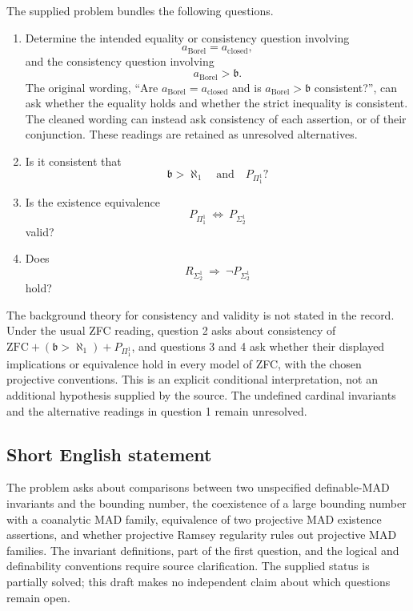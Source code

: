 \documentclass[11pt]{article}
\begin{document}
The supplied problem bundles the following questions.
\begin{enumerate}
\item Determine the intended equality or consistency question involving
\[
a_{\mathrm{Borel}}=a_{\mathrm{closed}},
\]
and the consistency question involving
\[
a_{\mathrm{Borel}}>\mathfrak b.
\]
The original wording, ``Are \(a_{\mathrm{Borel}}=a_{\mathrm{closed}}\) and is \(a_{\mathrm{Borel}}>\mathfrak b\) consistent?'', can ask whether the equality holds and whether the strict inequality is consistent. The cleaned wording can instead ask consistency of each assertion, or of their conjunction. These readings are retained as unresolved alternatives.
\item Is it consistent that
\[
\mathfrak b>\aleph_1\quad\text{and}\quad P_{\Pi^1_1}?
\]
\item Is the existence equivalence
\[
P_{\Pi^1_1}\ \Longleftrightarrow\ P_{\Sigma^1_2}
\]
valid?
\item Does
\[
R_{\Sigma^1_2}\ \Longrightarrow\ \neg P_{\Sigma^1_2}
\]
hold?
\end{enumerate}
The background theory for consistency and validity is not stated in the record. Under the usual ZFC reading, question 2 asks about consistency of \(\mathrm{ZFC}+(\mathfrak b>\aleph_1)+P_{\Pi^1_1}\), and questions 3 and 4 ask whether their displayed implications or equivalence hold in every model of ZFC, with the chosen projective conventions. This is an explicit conditional interpretation, not an additional hypothesis supplied by the source. The undefined cardinal invariants and the alternative readings in question 1 remain unresolved.
\subsection{Short English statement}
The problem asks about comparisons between two unspecified definable-MAD invariants and the bounding number, the coexistence of a large bounding number with a coanalytic MAD family, equivalence of two projective MAD existence assertions, and whether projective Ramsey regularity rules out projective MAD families. The invariant definitions, part of the first question, and the logical and definability conventions require source clarification. The supplied status is partially solved; this draft makes no independent claim about which questions remain open.
\end{document}
